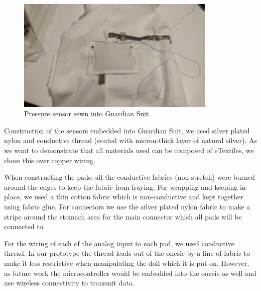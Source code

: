\documentclass{sigchi-ext}
\begin{document}
{{\begin{minipage}{0.925\marginparwidth}
\begin{figure} [H]
\end{figure}
      \begin{figure} [H]
   \centering \includegraphics[width=0.85\textwidth]{img/resize/w200/pe_integration.JPG}
    \caption{Pressure sensor sewn into Guardian Suit.}
\end{figure}
    \end{minipage}}\label{sec:sidebar3} }

Construction of the sensors embedded into Guardian Suit, we used 
silver plated nylon and conductive thread (coated with micron-thick layer of 
natural silver). As we want to demonstrate that all materials used can be
composed of eTextiles, we chose this over copper wiring.

When constructing the pads, all the conductive fabrics (non stretch) were
burned around the edges to keep the fabric from fraying.
For wrapping and keeping in place, we used a thin cotton
fabric which is non-conductive and kept together using
fabric glue.
For connectors we use the silver plated nylon fabric to make a stripe around
the stomach area for the main connector which all pads will be connected to.

For the wiring of each of the analog input to each pad, we used conductive
thread. In our prototype the thread leads out of the onesie by a line of
fabric to make it less restrictive when manipulating the doll which it is
put on. However, as future work the microcontroller would be embedded into
the onesie as well and use wireless connectivity to transmit data.
\end{document}

